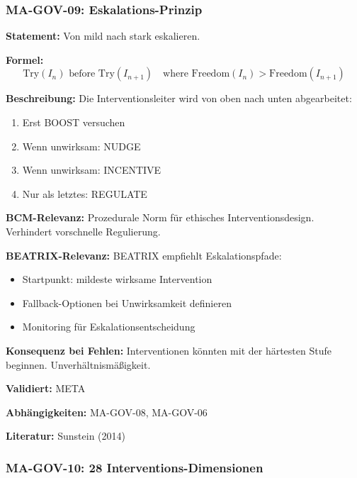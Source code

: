\subsubsection*{MA-GOV-09: Eskalations-Prinzip}

\textbf{Statement:} Von mild nach stark eskalieren.

\textbf{Formel:}
\begin{equation}
\text{Try}(I_n) \text{ before } \text{Try}(I_{n+1}) \quad \text{where } \text{Freedom}(I_n) > \text{Freedom}(I_{n+1})
\end{equation}

\textbf{Beschreibung:}
Die Interventionsleiter wird von oben nach unten abgearbeitet:
\begin{enumerate}
    \item Erst BOOST versuchen
    \item Wenn unwirksam: NUDGE
    \item Wenn unwirksam: INCENTIVE
    \item Nur als letztes: REGULATE
\end{enumerate}

\textbf{BCM-Relevanz:}
Prozedurale Norm für ethisches Interventionsdesign. Verhindert vorschnelle Regulierung.

\textbf{BEATRIX-Relevanz:}
BEATRIX empfiehlt Eskalationspfade:
\begin{itemize}
    \item Startpunkt: mildeste wirksame Intervention
    \item Fallback-Optionen bei Unwirksamkeit definieren
    \item Monitoring für Eskalationsentscheidung
\end{itemize}

\textbf{Konsequenz bei Fehlen:}
Interventionen könnten mit der härtesten Stufe beginnen. Unverhältnismäßigkeit.

\textbf{Validiert:} META

\textbf{Abhängigkeiten:} MA-GOV-08, MA-GOV-06

\textbf{Literatur:} Sunstein (2014)


\subsubsection*{MA-GOV-10: 28 Interventions-Dimensionen}

